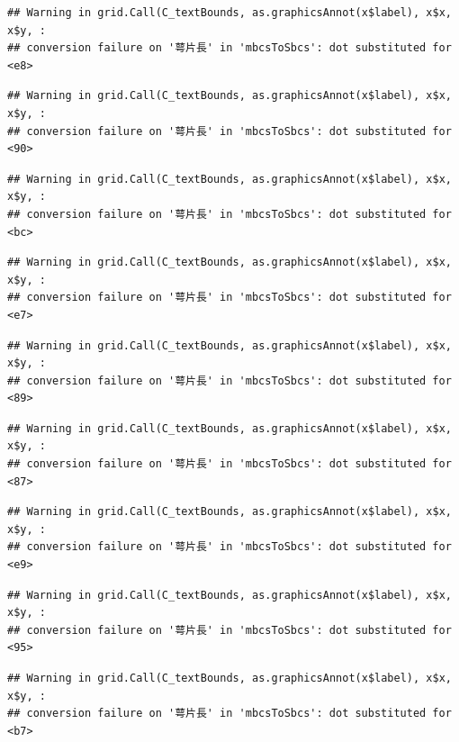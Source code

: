 \documentclass[
]{book}
\begin{document}
\begin{verbatim}
## Warning in grid.Call(C_textBounds, as.graphicsAnnot(x$label), x$x, x$y, :
## conversion failure on '萼片長' in 'mbcsToSbcs': dot substituted for <e8>
\end{verbatim}

\begin{verbatim}
## Warning in grid.Call(C_textBounds, as.graphicsAnnot(x$label), x$x, x$y, :
## conversion failure on '萼片長' in 'mbcsToSbcs': dot substituted for <90>
\end{verbatim}

\begin{verbatim}
## Warning in grid.Call(C_textBounds, as.graphicsAnnot(x$label), x$x, x$y, :
## conversion failure on '萼片長' in 'mbcsToSbcs': dot substituted for <bc>
\end{verbatim}

\begin{verbatim}
## Warning in grid.Call(C_textBounds, as.graphicsAnnot(x$label), x$x, x$y, :
## conversion failure on '萼片長' in 'mbcsToSbcs': dot substituted for <e7>
\end{verbatim}

\begin{verbatim}
## Warning in grid.Call(C_textBounds, as.graphicsAnnot(x$label), x$x, x$y, :
## conversion failure on '萼片長' in 'mbcsToSbcs': dot substituted for <89>
\end{verbatim}

\begin{verbatim}
## Warning in grid.Call(C_textBounds, as.graphicsAnnot(x$label), x$x, x$y, :
## conversion failure on '萼片長' in 'mbcsToSbcs': dot substituted for <87>
\end{verbatim}

\begin{verbatim}
## Warning in grid.Call(C_textBounds, as.graphicsAnnot(x$label), x$x, x$y, :
## conversion failure on '萼片長' in 'mbcsToSbcs': dot substituted for <e9>
\end{verbatim}

\begin{verbatim}
## Warning in grid.Call(C_textBounds, as.graphicsAnnot(x$label), x$x, x$y, :
## conversion failure on '萼片長' in 'mbcsToSbcs': dot substituted for <95>
\end{verbatim}

\begin{verbatim}
## Warning in grid.Call(C_textBounds, as.graphicsAnnot(x$label), x$x, x$y, :
## conversion failure on '萼片長' in 'mbcsToSbcs': dot substituted for <b7>
\end{verbatim}
\end{document}
